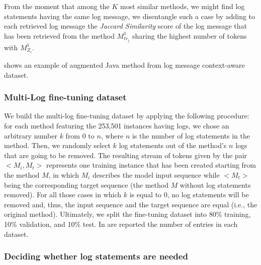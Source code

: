 From the moment that among the $K$ most similar methods, we might find log statements having the same log message, we disentangle such a case by adding to each retrieved log message the \textit{Jaccard Similarity} score of the log message that has been retrieved from the method $M_{tr_j}^{1}$ sharing the highest number of tokens with $M_{Z_i}^{1}$.


\figref{} shows an example of augmented Java method from log message context-aware dataset.



\subsubsection{Multi-Log fine-tuning dataset}

We build the multi-log fine-tuning dataset by applying the following procedure: for each method featuring the 253,501 instances having logs, we chose an arbitrary number $k$ from 0 to $n$, where $n$ is the number of log statements in the method. Then, we randomly select $k$ log statements out of the method’s $n$ logs that are going to be removed. The resulting stream of tokens given by the pair $<M_i, M_t>$ represents one training instance that has been created starting from the method $M$, in which $M_i$ describes the model input sequence while $<M_t>$ being  the corresponding target sequence (\ie the method $M$ without log statements removed). For all those cases in which $k$ is equal to 0, no log statements will be removed and, thus, the input sequence and the target sequence are equal (i.e., the original \java method). 
Ultimately, we split the fine-tuning dataset into 80\% training, 10\% validation, and 10\% test. In  are reported the number of entries in each dataset.  

\subsubsection{Deciding whether log statements are needed}

